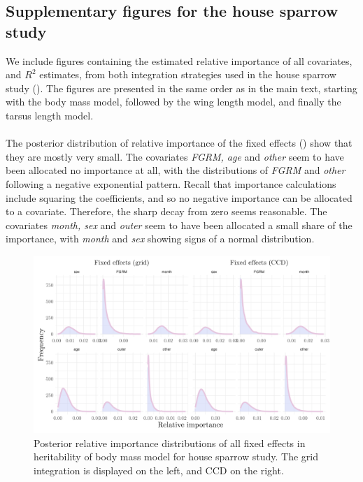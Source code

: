 \subsection*{Supplementary figures for the house sparrow study}

We include figures containing the estimated relative importance of all covariates, and $R^2$ estimates, from both integration strategies used in the house sparrow study (). The figures are presented in the same order as in the main text, starting with the body mass model, followed by the wing length model, and finally the tarsus length model.
\\
\\
The posterior distribution of relative importance of the fixed effects () show that they are mostly very small. The covariates \textit{FGRM, age} and \textit{other} seem to have been allocated no importance at all, with the distributions of \textit{FGRM} and \textit{other} following a negative exponential pattern. Recall that importance calculations include squaring the coefficients, and so no negative importance can be allocated to a covariate. Therefore, the sharp decay from zero seems reasonable. The covariates \textit{month, sex} and \textit{outer} seem to have been allocated a small share of the importance, with \textit{month} and \textit{sex} showing signs of a normal distribution.
\begin{figure}[H]%
  \centering
  \includegraphics[width=1\linewidth]{Figures/House sparrow study/Mass_fixed.png}
  \caption[Posterior relative importance distributions of all fixed effects in body mass model for house sparrow study]{Posterior relative importance distributions of all fixed effects in heritability of body mass model for house sparrow study. The grid integration is displayed on the left, and CCD on the right.}
  \label{fig:mass_fixed_sparrows}
\end{figure}

